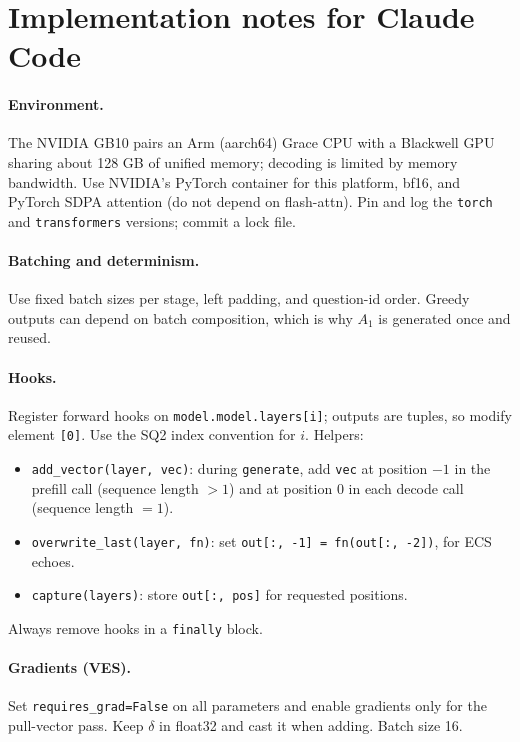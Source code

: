 \documentclass[11pt]{article}
\begin{document}
\section{Implementation notes for Claude Code}

\paragraph{Environment.} The NVIDIA GB10 pairs an Arm (aarch64) Grace CPU with a Blackwell GPU sharing about
128 GB of unified memory; decoding is limited by memory bandwidth. Use NVIDIA's PyTorch container for this
platform, bf16, and PyTorch SDPA attention (do not depend on flash-attn). Pin and log the \texttt{torch} and
\texttt{transformers} versions; commit a lock file.

\paragraph{Batching and determinism.} Use fixed batch sizes per stage, left padding, and question-id order.
Greedy outputs can depend on batch composition, which is why $A_1$ is generated once and reused.

\paragraph{Hooks.} Register forward hooks on \texttt{model.model.layers[i]}; outputs are tuples, so modify
element \texttt{[0]}. Use the SQ2 index convention for $i$. Helpers:
\begin{itemize}
  \item \texttt{add\_vector(layer, vec)}: during \texttt{generate}, add \texttt{vec} at position $-1$ in the
        prefill call (sequence length $>1$) and at position 0 in each decode call (sequence length $=1$).
  \item \texttt{overwrite\_last(layer, fn)}: set \texttt{out[:, -1] = fn(out[:, -2])}, for ECS echoes.
  \item \texttt{capture(layers)}: store \texttt{out[:, pos]} for requested positions.
\end{itemize}
Always remove hooks in a \texttt{finally} block.

\paragraph{Gradients (VES).} Set \texttt{requires\_grad=False} on all parameters and enable gradients only for
the pull-vector pass. Keep $\delta$ in float32 and cast it when adding. Batch size 16.
\end{document}
